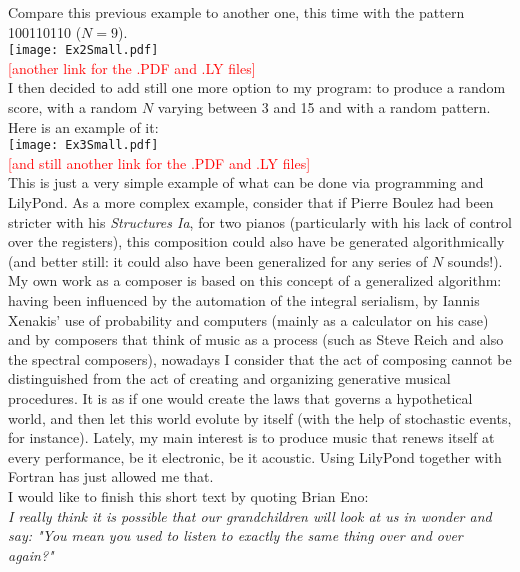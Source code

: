 \documentclass{article}
\begin{document}
Compare this previous example to another one, this time with the pattern 100110110 ($N=9$). \\

\texttt{[image: Ex2Small.pdf]} \\

\textcolor{red}{[another link for the .PDF and .LY files]} \\

I then decided to add still one more option to my program: to produce a random score, with a random $N$ varying between 3 and 15 and with a random pattern. 
Here is an example of it: \\

\texttt{[image: Ex3Small.pdf]} \\

\textcolor{red}{[and still another link for the .PDF and .LY files]} \\

This is just a very simple example of what can be done via programming and LilyPond. 
As a more complex example, consider that if Pierre Boulez had been stricter with his \textit{Structures Ia}, for two pianos (particularly with his lack of control over the registers), this composition could also have be generated algorithmically (and better still: it could also have been generalized for any series of $N$ sounds!). 
My own work as a composer is based on this concept of a generalized algorithm: 
having been influenced by the automation of the integral serialism, by Iannis Xenakis' use of probability and computers (mainly as a calculator on his case) and by composers that think of music as a process (such as Steve Reich and also the spectral composers), nowadays I consider that the act of composing cannot be distinguished from the act of creating and organizing generative musical procedures. 
It is as if one would create the laws that governs a hypothetical world, and then let this world evolute by itself (with the help of stochastic events, for instance). 
Lately, my main interest is to produce music that renews itself at every performance, be it electronic, be it acoustic. 
Using LilyPond together with Fortran has just allowed me that. \\

I would like to finish this short text by quoting Brian Eno: \\

\textit{I really think it is possible that our grandchildren will look at us in wonder and say: "You mean you used to listen to exactly the same thing over and over again?"}
\end{document}
